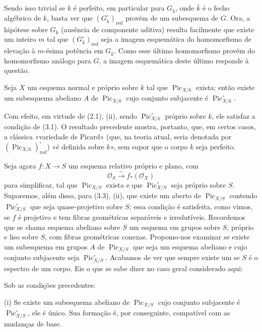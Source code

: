 Sendo isso trivial se $k$ é perfeito, em particular para $G_{\bar k}$, onde
$\bar k$ é o fecho algébrico de $k$, basta ver que
$(G_{\bar k}^\circ)_{\mathrm{red}}$ provém de um subesquema de $G$. Ora, a
hipótese sobre $G_{\bar k}$ (ausência de componente aditiva) resulta facilmente que existe um inteiro
$m$ tal que $(G_{\bar k}^\circ)_{\mathrm{red}}$ seja a imagem esquemática do
homomorfismo de elevação à $m$-ésima potência em $G_{\bar k}$. Como esse último
homomorfismo provém do homomorfismo análogo para $G$, a imagem esquemática deste
último responde à questão.

 Seja $X$ um esquema normal e próprio sobre $k$ tal que
$\operatorname{Pic}_{X/k}$ exista; então existe um subesquema abeliano $A$ de
$\operatorname{Pic}_{X/k}$ cujo conjunto subjacente é
$\operatorname{Pic}_{X/k}^\circ$.

Com efeito, em virtude de (2.1), (ii), sendo
$\operatorname{Pic}_{X/k}^\circ$ próprio sobre $k$, ele satisfaz a condição de
(3.1).
O resultado precedente mostra, portanto, que, em certos casos, a clássica
«variedade de Picard» (que, na teoria atual, seria denotada por
$(\operatorname{Pic}_{X/k})_{\mathrm{red}}^\circ$) «é definida sobre $k$»,
sem supor que o corpo $k$ seja perfeito.

Seja agora $f:X\longrightarrow S$ um esquema relativo próprio e plano, com
\[
\mathcal O_S\xrightarrow{\sim}f_*(\mathcal O_X)
\]
para simplificar, tal que $\operatorname{Pic}_{X/S}$ exista e que
$\operatorname{Pic}_{X/S}^\circ$ seja próprio sobre $S$. Suporemos, além
disso, para (3.3), (ii), que existe um aberto de $\operatorname{Pic}_{X/S}$
contendo $\operatorname{Pic}_{X/S}^\circ$ que seja quase-projetivo sobre $S$;
essa condição é satisfeita, como vimos, se $f$ é projetivo e tem fibras
geométricas separáveis e irredutíveis. Recordemos que se chama esquema
abeliano sobre $S$ um esquema em grupos sobre $S$, próprio e liso sobre
$S$, com fibras geométricas conexas. Propomo-nos
examinar se existe um subesquema em grupos $A$ de
$\operatorname{Pic}_{X/S}$ que seja um esquema abeliano e cujo conjunto
subjacente seja $\operatorname{Pic}_{X/S}^\circ$. Acabamos de ver que sempre
existe um se $S$ é o espectro de um corpo. Eis o que se sabe dizer no caso
geral considerado aqui:

 Sob as condições precedentes:

\noindent(i) Se existe um subesquema abeliano de
$\operatorname{Pic}_{X/S}$ cujo conjunto subjacente é
$\operatorname{Pic}_{X/S}^\circ$, ele é único. Sua formação é, por
conseguinte, compatível com as mudanças de base.

